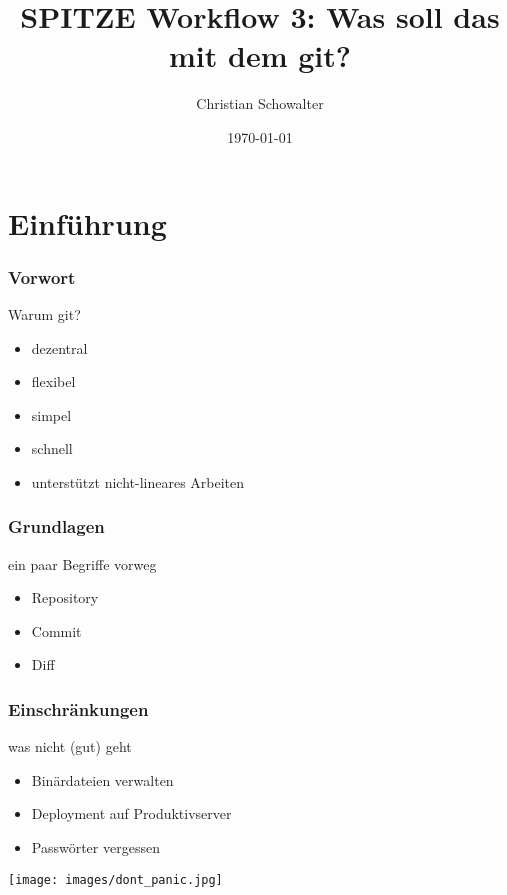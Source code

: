 \documentclass{beamer}
\title{SPITZE Workflow 3: Was soll das mit dem git?}
\author{Christian Schowalter}
\date{\today}
\begin{document}
\maketitle

\section{Einführung}

\begin{frame}
	\frametitle{Vorwort}
	\begin{block}{Warum git?}
		\begin{itemize}
			\item dezentral
			\item flexibel
			\item simpel
			\item schnell
			\item unterstützt nicht-lineares Arbeiten
		\end{itemize}
	\end{block}
\end{frame}

\begin{frame}
	\frametitle{Grundlagen}
	\begin{block}{ein paar Begriffe vorweg}
		\begin{itemize}
			\item Repository
			\item Commit
			\item Diff
		\end{itemize}
	\end{block}
\end{frame}

\begin{frame}
	\frametitle{Einschränkungen}
	\begin{block}{was nicht (gut) geht}
		\begin{itemize}
			\item Binärdateien verwalten
			\item Deployment auf Produktivserver
			\item Passwörter vergessen
		\end{itemize}
	\end{block}
\end{frame}

\begin{frame}
	\texttt{[image: images/dont\_panic.jpg]}
\end{frame}
\end{document}

